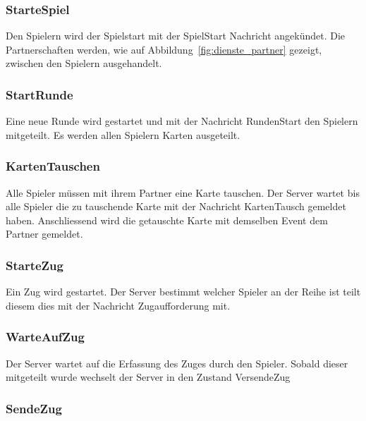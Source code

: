 \documentclass[12pt,halfparskip]{scrartcl}
\begin{document}
\subsubsection{StarteSpiel} %
\label{ssub:startespiel}
Den Spielern wird der Spielstart mit der SpielStart Nachricht angekündet. Die Partnerschaften werden, wie auf Abbildung~\vref{fig:dienste_partner} gezeigt, zwischen den Spielern ausgehandelt.


\subsubsection{StartRunde} %
\label{ssub:startrunde}
Eine neue Runde wird gestartet und mit der Nachricht RundenStart den Spielern mitgeteilt. Es werden allen Spielern Karten ausgeteilt.


\subsubsection{KartenTauschen} %
\label{ssub:kartentauschen}
Alle Spieler müssen mit ihrem Partner eine Karte tauschen. Der Server wartet bis alle Spieler die zu tauschende Karte mit der Nachricht KartenTausch gemeldet haben. Anschliessend wird die getauschte Karte mit demselben Event dem Partner gemeldet.


\subsubsection{StarteZug} %
\label{ssub:startezug}
Ein Zug wird gestartet. Der Server bestimmt welcher Spieler an der Reihe ist teilt diesem dies mit der Nachricht Zugaufforderung mit. 


\subsubsection{WarteAufZug} %
\label{ssub:warteaufzug}
Der Server wartet auf die Erfassung des Zuges durch den Spieler. Sobald dieser mitgeteilt wurde wechselt der Server in den Zustand VersendeZug 

\subsubsection{SendeZug} %
\label{ssub:sendezug}
\end{document}
